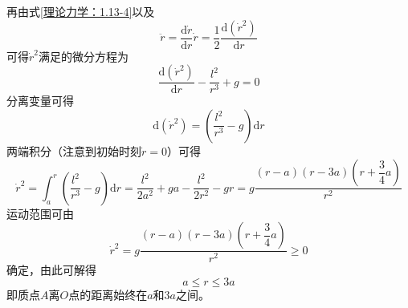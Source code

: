 \begin{solution}
\begin{enumerate}
\begin{equation*}
\end{equation*}
再由式\eqref{理论力学：1.13-4}以及
\begin{equation*}
	\ddot{r} = \frac{\mathrm{d} \dot{r}}{\mathrm{d} r} \dot{r} = \frac12 \frac{\mathrm{d} \left(\dot{r}^2\right)}{\mathrm{d} r}
\end{equation*}
可得$\dot{r}^2$满足的微分方程为
\begin{equation*}
	\frac{\mathrm{d} \left(\dot{r}^2\right)}{\mathrm{d} r} - \frac{l^2}{r^3} + g = 0
\end{equation*}
分离变量可得
\begin{equation*}
	\mathrm{d} \left(\dot{r}^2\right) = \left(\frac{l^2}{r^3} - g\right) \mathrm{d} r
\end{equation*}
两端积分（注意到初始时刻$\dot{r}=0$）可得
\begin{equation*}
	\dot{r}^2 = \int_a^r \left(\frac{l^2}{r^3} - g\right) \mathrm{d} r = \frac{l^2}{2a^2} + ga - \frac{l^2}{2r^2} - gr = g \frac{(r-a)(r-3a)\left(r+\dfrac34 a\right)}{r^2}
\end{equation*}
运动范围可由
\begin{equation*}
	\dot{r}^2 = g \frac{(r-a)(r-3a)\left(r+\dfrac34 a\right)}{r^2} \geqslant 0
\end{equation*}
确定，由此可解得
\begin{equation*}
	a \leqslant r \leqslant 3a
\end{equation*}
即质点$A$离$O$点的距离始终在$a$和$3a$之间。
\end{enumerate}
\end{solution}

